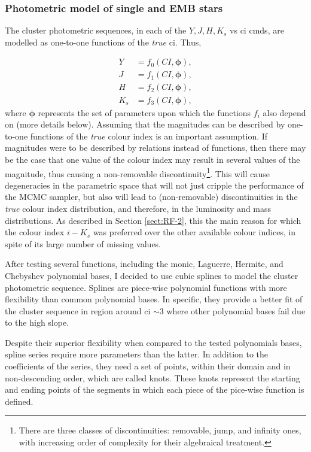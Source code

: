 \subsubsection{Photometric model of single and EMB stars}
\label{sect:cluster_ph}

The cluster photometric sequences, in each of the $Y,J,H,K_s$ vs \gls{ci} \glspl{cmd}, are modelled as one-to-one functions of the \emph{true} \gls{ci}. Thus,

\begin{align}
Y&=f_0(CI,\boldsymbol{\phi}),\nonumber\\
J&=f_1(CI,\boldsymbol{\phi}),\nonumber\\
H&=f_2(CI,\boldsymbol{\phi}),\nonumber\\
K_s&=f_3(CI,\boldsymbol{\phi}),\nonumber
\end{align}
where $\boldsymbol{\phi}$ represents the set of parameters upon which the functions $f_i$ also depend on (more details below). Assuming that the magnitudes can be described by one-to-one functions of the \emph{true} colour index is an important assumption. If magnitudes were to be described by relations instead of functions, then there may be the case that one value of the colour index may result in several values of the magnitude, thus causing a non-removable discontinuity\footnote{There are three classes of discontinuities: removable, jump, and infinity ones, with increasing order of complexity for their algebraical treatment.}. This will cause degeneracies in the parametric space that will not just cripple the performance of the MCMC sampler, but also will lead to (non-removable) discontinuities in the \emph{true} colour index distribution, and therefore, in the luminosity and mass distributions. As described in Section \ref{sect:RF-2}, this the main reason for which the colour index $i-K_s$ was preferred over the other available colour indices, in spite of its large number of missing values.

After testing several functions, including the monic, Laguerre, Hermite, and Chebyshev polynomial bases, I decided to use cubic splines to model the cluster photometric sequence. Splines are piece-wise polynomial functions with more flexibility than common polynomial bases. In specific, they provide a better fit of the cluster sequence in region around \gls{ci} $\sim 3$ where other polynomial bases fail due to the high slope. 

Despite their superior flexibility when compared to the tested polynomials bases, spline series require more parameters than the latter. In addition to the coefficients of the series, they need a set of points, within their domain and in non-descending order, which are called knots. These knots represent the starting and ending points of the segments in which each piece of the pice-wise function is defined.

